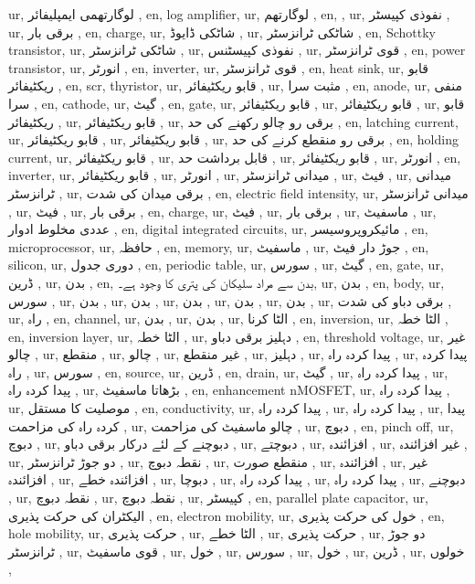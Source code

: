 ur, لوگارتھمی ایمپلیفائر ,
en, log amplifier,
ur, لوگارتھم ,
en, ,
ur, نفوذی کپیسٹر ,
ur, برقی بار ,
en, charge,
ur, شاٹکی ڈایوڈ ,
ur, شاٹکی ٹرانزسٹر ,
en, Schottky transistor,
ur, شاٹکی ٹرانزسٹر ,
ur, نفوذی کپیسٹنس ,
ur, قوی ٹرانزسٹر ,
en, power transistor,
ur, انورٹر ,
en, inverter,
ur, قوی ٹرانزسٹر ,
en, heat sink,
ur, قابو ریکٹیفائر ,
en, scr, thyristor,
ur, قابو ریکٹیفائر ,
ur, مثبت سرا ,
en, anode,
ur, منفی سرا ,
en, cathode,
ur, گیٹ ,
en, gate,
ur, قابو ریکٹیفائر ,
ur, قابو ریکٹیفائر ,
ur, قابو ریکٹیفائر ,
ur, قابو ریکٹیفائر ,
ur, برقی رو چالو رکھنے کی حد ,
en, latching current,
ur, قابو ریکٹیفائر ,
ur, قابو ریکٹیفائر ,
ur, برقی رو منقطع کرنے کی حد ,
en, holding current,
ur, قابو ریکٹیفائر ,
ur, قابل برداشت حد ,
ur, قابو ریکٹیفائر ,
ur, انورٹر ,
en, inverter,
ur, قابو ریکٹیفائر ,
ur, انورٹر ,
ur, میدانی ٹرانزسٹر ,
ur, فیٹ ,
ur, میدانی ٹرانزسٹر ,
ur, برقی میدان کی شدت ,
en, electric field intensity,
ur, میدانی ٹرانزسٹر ,
ur, فیٹ ,
ur, برقی بار ,
en, charge,
ur, فیٹ ,
ur, برقی بار ,
ur, ماسفیٹ ,
ur, عددی مخلوط ادوار ,
en, digital integrated circuits,
ur, مائیکروپروسیسر ,
en, microprocessor,
ur, حافظہ ,
en, memory,
ur, ماسفیٹ ,
ur, جوڑ دار فیٹ ,
en, silicon,
ur, دوری جدول ,
en, periodic table,
ur, سورس ,
ur, گیٹ ,
en, gate,
ur, ڈرین ,
ur, بدن ,
en, بدن سے مراد سلیکان کی پتری کا وجود ہے۔,
ur, بدن ,
en, body,
ur, سورس ,
ur, بدن ,
ur, بدن ,
ur, بدن ,
ur, بدن ,
ur, بدن ,
ur, برقی دباو کی شدت ,
ur, راہ ,
en, channel,
ur, بدن ,
ur, بدن ,
ur, الٹا کرنا ,
en, inversion,
ur, الٹا خطہ ,
en, inversion layer,
ur, الٹا خطہ ,
ur, دہلیز برقی دباو ,
en, threshold voltage,
ur, غیر چالو ,
ur, منقطع ,
ur, چالو ,
ur, غیر منقطع ,
ur, دہلیز ,
ur, پیدا کردہ راہ ,
ur, پیدا کردہ راہ ,
ur, سورس ,
en, source,
ur, ڈرین ,
en, drain,
ur, گیٹ ,
ur, پیدا کردہ راہ ,
ur, پیدا کردہ راہ ,
ur, بڑھاتا ماسفیٹ ,
en, enhancement nMOSFET,
ur, پیدا کردہ راہ ,
ur, موصلیت کا مستقل ,
en, conductivity,
ur, پیدا کردہ راہ ,
ur, پیدا کردہ راہ ,
ur, پیدا کردہ راہ کی مزاحمت ,
ur, چالو ماسفیٹ کی مزاحمت ,
ur, دبوچ ,
en, pinch off,
ur, دبوچ ,
ur, دبوچنے کے لئے درکار برقی دباو ,
ur, دبوچتے ,
ur, افزائندہ ,
ur, غیر افزائندہ ,
ur, دو جوڑ ٹرانزسٹر ,
ur, نقطہ دبوچ ,
ur, منقطع صورت ,
ur, افزائندہ ,
ur, غیر افزائندہ ,
ur, افزائندہ خطے ,
ur, دبوچا ,
ur, پیدا کردہ راہ ,
ur, پیدا کردہ راہ ,
ur, دبوچنے ,
ur, نقطہ دبوچ ,
ur, نقطہ دبوچ ,
ur, کپیسٹر ,
en, parallel plate capacitor,
ur, الیکٹران کی حرکت پذیری ,
en, electron mobility,
ur, خول کی حرکت پذیری ,
en, hole mobility,
ur, حرکت پذیری ,
ur, الٹا خطے ,
ur, حرکت پذیری ,
ur, دو جوڑ ٹرانزسٹر ,
ur, قوی ماسفیٹ ,
ur, خول ,
ur, سورس ,
ur, خول ,
ur, ڈرین ,
ur, خولوں ,
